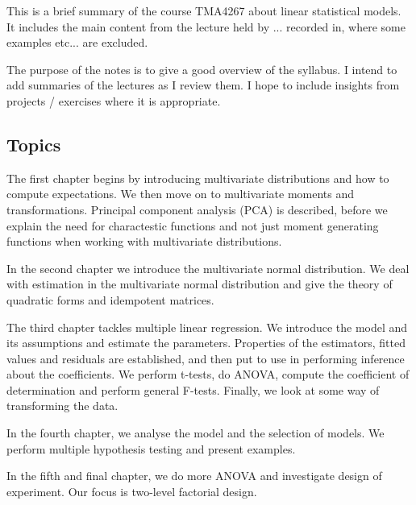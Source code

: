 
This is a brief summary of the course TMA4267 about linear statistical models. It includes the main content from the lecture held by ... recorded in, where some examples etc... are excluded. 

The purpose of the notes is to give a good overview of the syllabus. I intend to add summaries of the lectures as I review them. I hope to include insights from projects / exercises where it is appropriate. 

\subsection*{Topics}
The first chapter begins by introducing multivariate distributions and how to compute expectations. We then move on to multivariate moments and transformations. Principal component analysis (PCA) is described, before we explain the need for charactestic functions and not just moment generating functions when working with multivariate distributions. 

In the second chapter we introduce the multivariate normal distribution. We deal with estimation in the multivariate normal distribution and give the theory of quadratic forms and idempotent matrices.

The third chapter tackles multiple linear regression. We introduce the model and its assumptions and estimate the parameters. Properties of the estimators, fitted values and residuals are established, and then put to use in performing inference about the coefficients. We perform t-tests, do ANOVA, compute the coefficient of determination and perform general F-tests. Finally, we look at some way of transforming the data.

In the fourth chapter, we analyse the model and the selection of models. We perform multiple hypothesis testing and present examples. 

In the fifth and final chapter, we do more ANOVA and investigate design of experiment. Our focus is two-level factorial design.